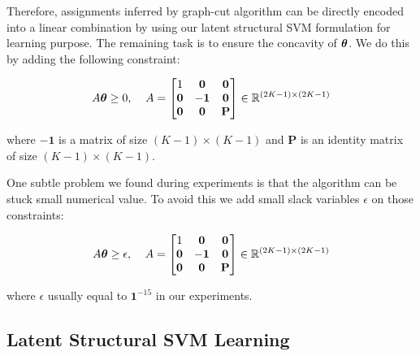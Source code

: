 Therefore, assignments inferred by graph-cut algorithm can be
directly encoded into a linear combination by using our latent
structural SVM formulation for learning purpose. The remaining
task is to ensure the concavity of ${\bm{\theta}}$. We do this by
adding the following constraint:

\begin{align}
  A{\bm{\theta}}\geq0 \text{,\;~~~} A=
                  \begin{bmatrix}
                    1 & \mathbf{0} & \mathbf{0}\\
                    \mathbf{0} & -\mathbf{1} & \mathbf{0}\\
                    \mathbf{0} & \mathbf{0} & \mathbf{P}
                  \end{bmatrix}\in \mathbb{R}^{(2K-1)\times(2K-1)}
\end{align}

\noindent where $-\mathbf{1}$ is a matrix of size $(K-1)\times(K-1)$ and
$\mathbf{P}$ is an identity matrix of size $(K-1)\times(K-1)$.

One subtle problem we found during experiments is that the
algorithm can be stuck small numerical value. To avoid this we
add small slack variables $\epsilon$ on those constraints:

\begin{align}
  \label{eq:concave_constraint}
  A{\bm{\theta}}\geq\epsilon \text{,\;~~~} A=
                  \begin{bmatrix}
                    1 & \mathbf{0} & \mathbf{0}\\
                    \mathbf{0} & -\mathbf{1} & \mathbf{0}\\
                    \mathbf{0} & \mathbf{0} & \mathbf{P}
                  \end{bmatrix}\in \mathbb{R}^{(2K-1)\times(2K-1)}
\end{align}

\noindent where $\epsilon$ usually equal to $\mathbf{1}^{-15}$ in our
experiments.

\subsection{Latent Structural SVM Learning}
\label{sec:mrflssvm_learning_algo}

